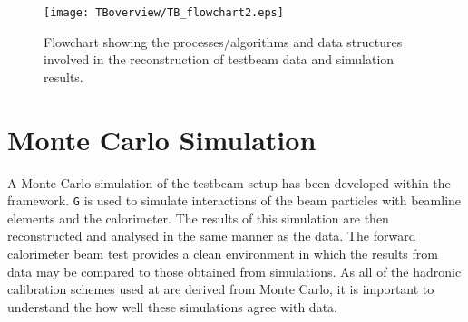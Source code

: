 \begin{figure}[tb]
\begin{center}
\texttt{[image: TBoverview/TB\_flowchart2.eps]}
\end{center}

\caption[Flowchart showing the algorithms used during reconstruction]{Flowchart showing the processes/algorithms and data structures involved in the reconstruction of testbeam data and simulation results.}
\label{TB_data_flowchart}
\end{figure}
\section{Monte Carlo Simulation}


A Monte Carlo simulation of the testbeam setup has been developed within the \athena framework.  {\tt G\scalebox{0.9}{EANT4.9.2}} \cite{geant4} is used to simulate interactions of the beam particles with beamline elements and the calorimeter. The results of this simulation are then reconstructed and analysed in the same manner as the data. The forward calorimeter beam test provides a clean environment in which the results from data may be compared to those obtained from simulations. As all of the hadronic calibration schemes used at \atlas are derived from Monte Carlo, it is important to understand the how well these simulations agree with data.

